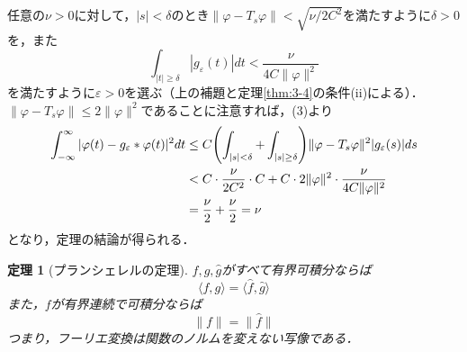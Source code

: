 \documentclass[dvipdfmx,a4j,10pt]{jsarticle}
\makeatletter
\theoremstyle{mystyle1}
\newtheorem{theorem}{定理}[section]
\theoremstyle{mystyle3}
\theoremstyle{mystyle4}
\theoremstyle{mystyle6}
\theoremstyle{mystyle2}
\theoremstyle{mystyle5}
\renewenvironment{proof}[1][\proofname]{\par
  \pushQED{\qed}%
  \normalfont
  \topsep6\p@\@plus6\p@ \trivlist
  \item[\hskip\labelsep{\bfseries\sffamily #1}]\ignorespaces
}{%
  \popQED\endtrivlist\@endpefalse
}
\renewcommand\proofname{証明}
\newenvironment{thm}[1][]
{\begin{tcolorbox}[
    enhanced,
    boxrule=0pt,
    arc=0mm,
    frame hidden,
    borderline west={2pt}{-4pt}{red},
    breakable = true
    ]
    \begin{theorem}[#1]
}
{\end{theorem}\end{tcolorbox}}
\makeatother
\begin{document}
\begin{proof}
	任意の$\nu>0$に対して，$|s|<\delta$のとき$\|\varphi-T_s\varphi\|<\sqrt{\nu/2C^2}$を満たすように$\delta>0$を，また
	\[
		\int_{|t|\geq\delta}|g_\varepsilon(t)|dt<\frac{\nu}{4C\|\varphi\|^2}
	\]
	を満たすように$\varepsilon>0$を選ぶ（上の補題と定理\ref{thm:3-4}の条件(ii)による）．$\|\varphi-T_s\varphi\|\leq 2\|\varphi\|^2$であることに注意すれば，(3)より
	\[
		\begin{split}
			\int_{-\infty}^\infty |\varphi(t)-g_\varepsilon*\varphi(t)|^2dt
			&\leq C\mleft(\int_{|s|<\delta}+\int_{|s|\geq\delta}\mright)\|\varphi-T_s\varphi\|^2|g_\varepsilon(s)|ds \\
			&<C\cdot\frac{\nu}{2C^2}\cdot C+C\cdot 2\|\varphi\|^2\cdot\frac{\nu}{4C\|\varphi\|^2} \\
			&=\frac{\nu}{2}+\frac{\nu}{2}=\nu
		\end{split}
	\]
	となり，定理の結論が得られる．
\end{proof}

\begin{thm}[プランシェレルの定理]\label{thm:3-7}
	$f,g,\hat g$がすべて有界可積分ならば
	\[
		\langle f,g\rangle=\langle \hat f,\hat g\rangle
	\]
	また，$f$が有界連続で可積分ならば
	\[
		\|f\|=\|\hat f\|
	\]
	つまり，フーリエ変換は関数のノルムを変えない写像である．
\end{thm}
\end{document}
